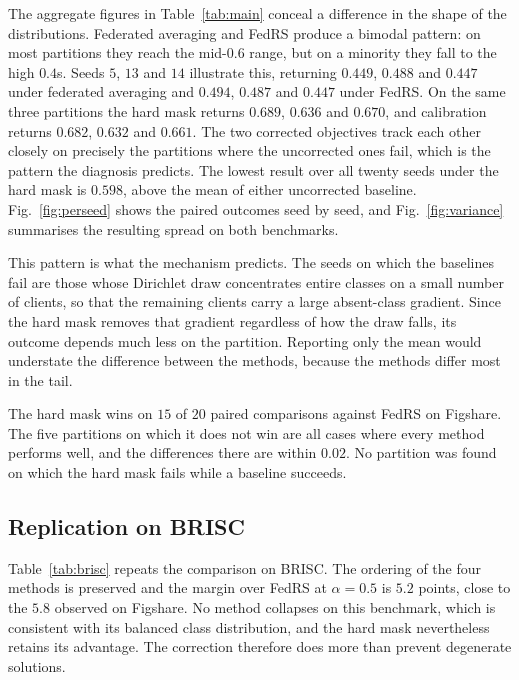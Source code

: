 \documentclass[journal]{IEEEtran}
\begin{document}
The aggregate figures in Table~\ref{tab:main} conceal a difference in the shape
of the distributions. Federated averaging and FedRS produce a bimodal pattern:
on most partitions they reach the mid-$0.6$ range, but on a minority they fall
to the high $0.4$s. Seeds $5$, $13$ and $14$ illustrate this, returning $0.449$,
$0.488$ and $0.447$ under federated averaging and $0.494$, $0.487$ and $0.447$
under FedRS. On the same three partitions the hard mask returns $0.689$, $0.636$
and $0.670$, and calibration returns $0.682$, $0.632$ and $0.661$. The two
corrected objectives track each other closely on precisely the partitions where
the uncorrected ones fail, which is the pattern the diagnosis predicts. The
lowest result over all twenty seeds under the hard mask is $0.598$, above the
mean of either uncorrected baseline. Fig.~\ref{fig:perseed} shows the paired
outcomes seed by seed, and Fig.~\ref{fig:variance} summarises the resulting
spread on both benchmarks.

This pattern is what the mechanism predicts. The seeds on which the baselines
fail are those whose Dirichlet draw concentrates entire classes on a small
number of clients, so that the remaining clients carry a large absent-class
gradient. Since the hard mask removes that gradient regardless of how the draw
falls, its outcome depends much less on the partition. Reporting only the mean
would understate the difference between the methods, because the methods differ
most in the tail.

The hard mask wins on $15$ of $20$ paired comparisons against FedRS on Figshare.
The five partitions on which it does not win are all cases where every method
performs well, and the differences there are within $0.02$. No partition was
found on which the hard mask fails while a baseline succeeds.

\subsection{Replication on BRISC}
Table~\ref{tab:brisc} repeats the comparison on BRISC. The ordering of the four
methods is preserved and the margin over FedRS at $\alpha = 0.5$ is $5.2$
points, close to the $5.8$ observed on Figshare. No method collapses on this
benchmark, which is consistent with its balanced class distribution, and the
hard mask nevertheless retains its advantage. The correction therefore does more
than prevent degenerate solutions.
\end{document}
